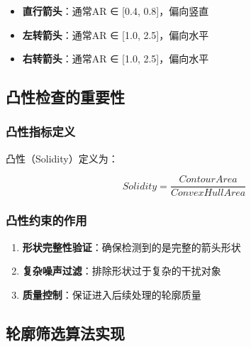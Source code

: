 \documentclass[12pt]{article}
\begin{document}
\begin{itemize}
    \item \textbf{直行箭头}：通常AR ∈ [0.4, 0.8]，偏向竖直
    \item \textbf{左转箭头}：通常AR ∈ [1.0, 2.5]，偏向水平
    \item \textbf{右转箭头}：通常AR ∈ [1.0, 2.5]，偏向水平
\end{itemize}

\subsection{凸性检查的重要性}

\subsubsection{凸性指标定义}

凸性（Solidity）定义为：

\begin{equation}
Solidity = \frac{ContourArea}{ConvexHullArea}
\end{equation}

\subsubsection{凸性约束的作用}

\begin{enumerate}
    \item \textbf{形状完整性验证}：确保检测到的是完整的箭头形状
    \item \textbf{复杂噪声过滤}：排除形状过于复杂的干扰对象
    \item \textbf{质量控制}：保证进入后续处理的轮廓质量
\end{enumerate}

\subsection{轮廓筛选算法实现}
\end{document}
